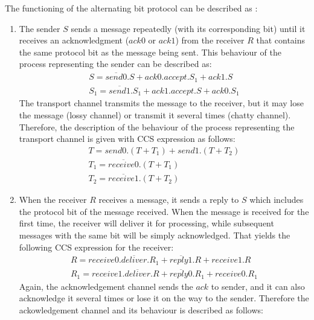 The functioning of the alternating bit protocol can be described as \cite{ReactiveSystems}:
\begin{enumerate}
	\item The sender $S$ sends a message repeatedly (with its corresponding bit) until it receives an acknowledgment ($ack0$ or $ack1$) from the receiver $R$ that contains the same protocol bit as the message being sent. This behaviour of the process representing the sender can be described as:
				\begin{equation*}\label{send_imp}
				    \begin{array}{lcl}
							S = \overline{send0}.S+ack0.accept.S_{1}+ack1.S \\
							S_{1}=\overline{send1}.S_{1}+ack1.accept.S+ack0.S_{1}				  
						\end{array}
				\end{equation*}
	      The transport channel transmits the message to the receiver, but it may lose the message (lossy channel) or transmit it several times (chatty channel). Therefore, the description of the behaviour of the process representing the transport channel is given with CCS expression as follows:
	      \begin{equation*}\label{trans_imp}
	      	\begin{array}{lcl}
						T=send0.\left(T+T_{1}\right)+send1.\left(T+T_{2}\right)\\
						T_{1}=\overline{receive0}.\left(T+T_{1}\right)\\
						T_{2}=\overline{receive1}.\left(T+T_{2}\right)
					\end{array}
				\end{equation*}
  \item When the receiver $R$ receives a message, it sends a reply to $S$ which includes the protocol bit of the message received. When the message is received for the first time, the receiver will deliver it for processing, while subsequent messages with the same bit will be simply acknowledged. That yields the following CCS expression for the receiver:
  			\begin{equation*}\label{rec_imp}
				    \begin{array}{lcl}
							R=receive0.\overline{deliver}.R_{1}+\overline{reply1}.R+receive1.R \\
							R_{1}=receive1.\overline{deliver}.R+\overline{reply0}.R_{1}+receive0.R_{1}			  
						\end{array}
				\end{equation*}
        Again, the acknowledgement channel sends the $ack$ to sender, and it can also acknowledge it several times or lose it on the way to the sender. Therefore the ackowledgement channel and its behaviour is described as follows:

\end{enumerate}
